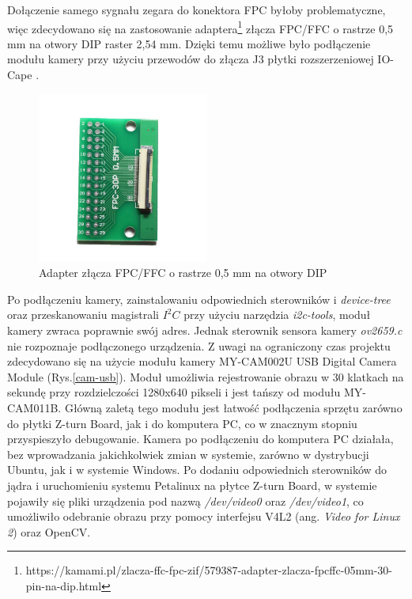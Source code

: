 Dołączenie samego sygnału zegara do konektora FPC byłoby problematyczne, więc zdecydowano się na zastosowanie adaptera\footnote{https://kamami.pl/zlacza-ffc-fpc-zif/579387-adapter-zlacza-fpcffc-05mm-30-pin-na-dip.html} złącza FPC/FFC o rastrze 0,5 mm na otwory DIP raster 2,54 mm. Dzięki temu możliwe było podłączenie modułu kamery przy użyciu przewodów do złącza J3 płytki rozszerzeniowej IO-Cape \cite{ZturnIOCapeSchematic}.


\begin{figure}[!h]
  \centering
  \includegraphics[width=0.5\textwidth]{img/dvp-adapter.jpg}
  \caption{Adapter złącza FPC/FFC o rastrze 0,5 mm na otwory DIP}
  \label{cam-schematic}
\end{figure}


Po podłączeniu kamery, zainstalowaniu odpowiednich sterowników i \emph{device-tree} oraz przeskanowaniu magistrali $I^2C$ przy użyciu narzędzia \emph{i2c-tools}, moduł kamery zwraca poprawnie swój adres. Jednak sterownik sensora kamery \emph{ov2659.c} nie rozpoznaje podłączonego urządzenia. Z uwagi na ograniczony czas projektu zdecydowano się na użycie modułu kamery MY-CAM002U USB Digital Camera Module (Rys.\ref{cam-usb}). Moduł umożliwia rejestrowanie obrazu w 30 klatkach na sekundę przy rozdzielczości 1280x640 pikseli i jest tańszy od modułu MY-CAM011B. Główną zaletą tego modułu jest łatwość podłączenia sprzętu zarówno do płytki Z-turn Board, jak i do komputera PC, co w znacznym stopniu przyspieszyło debugowanie. Kamera po podłączeniu do komputera PC działała, bez wprowadzania jakichkolwiek zmian w systemie, zarówno w dystrybucji Ubuntu, jak i w systemie Windows. Po dodaniu odpowiednich sterowników do jądra i uruchomieniu systemu Petalinux na płytce Z-turn Board, w systemie pojawiły się pliki urządzenia pod nazwą \emph{/dev/video0} oraz \emph{/dev/video1}, co umożliwiło odebranie obrazu przy pomocy interfejsu V4L2 (ang. \emph{Video for Linux 2}) oraz OpenCV.


